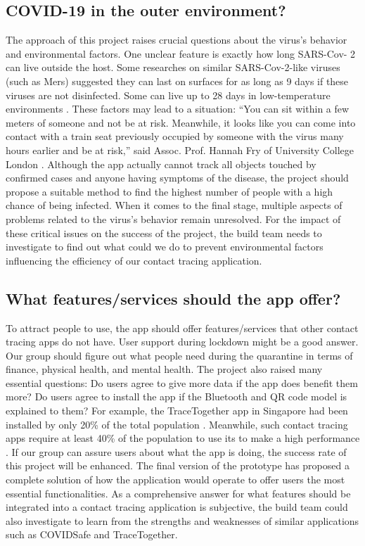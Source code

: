   \subsection{COVID-19 in the outer environment?}
    \par The approach of this project raises crucial questions about the virus’s behavior and environmental factors. One unclear feature is exactly how long SARS-Cov- 2 can live outside the host. Some researches on similar SARS-Cov-2-like viruses (such as Mers) suggested they can last on surfaces for as long as 9 days if these viruses are not disinfected. Some can live up to 28 days in low-temperature environments \parencite{Questions3}. These factors may lead to a situation: “You can sit within a few meters of someone and not be at risk. Meanwhile, it looks like you can come into contact with a train seat previously occupied by someone with the virus many hours earlier and be at risk,” said Assoc. Prof. Hannah Fry of University College London \parencite{Questions4}. Although the app actually cannot track all objects touched by confirmed cases and anyone having symptoms of the disease, the project should propose a suitable method to find the highest number of people with a high chance of being infected. When it comes to the final stage, multiple aspects of problems related to the virus's behavior remain unresolved. For the impact of these critical issues on the success of the project, the build team needs to investigate to find out what could we do to prevent environmental factors influencing the efficiency of our contact tracing application.

  \subsection{What features/services should the app offer?}
    \par To attract people to use, the app should offer features/services that other contact tracing apps do not have. User support during lockdown might be a good answer. Our group should figure out what people need during the quarantine in terms of finance, physical health, and mental health. The project also raised many essential questions: Do users agree to give more data if the app does benefit them more? Do users agree to install the app if the Bluetooth and QR code model is explained to them? For example, the TraceTogether app in Singapore had been installed by only 20\% of the total population \parencite{SingTraceTogether}. Meanwhile, such contact tracing apps require at least 40\% of the population to use its to make a high performance \parencite{Questions5}. If our group can assure users about what the app is doing, the success rate of this project will be enhanced. The final version of the prototype has proposed a complete solution of how the application would operate to offer users the most essential functionalities. As a comprehensive answer for what features should be integrated into a contact tracing application is subjective, the build team could also investigate to learn from the strengths and weaknesses of similar applications such as COVIDSafe and TraceTogether.

